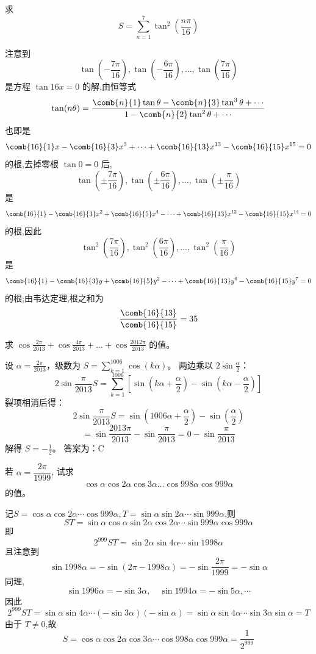 \begin{questions}
    \question 求  
    \[
    S = \sum_{n=1}^7 \tan^2\left(\frac{n\pi}{16}\right)
    \]
    \begin{solution}
        注意到 $$\tan\left(-\frac{7\pi}{16}\right), \tan\left(-\frac{6\pi}{16}\right), \dots, \tan\left(\frac{7\pi}{16}\right)$$ 是方程 $\tan16x = 0$ 的解,由恒等式
        \[
        \tan(n\theta) = \frac{\comb{n}{1} \tan\theta - \comb{n}{3} \tan^3\theta + \cdots}{1 - \comb{n}{2} \tan^2\theta + \cdots}
        \]也即是
        \[
        \comb{16}{1}x - \comb{16}{3}x^3 + \cdots + \comb{16}{13}x^{13} - \comb{16}{15}x^{15} = 0
        \]
        的根,去掉零根 $\tan0=0$ 后,
        $$\tan\left(\pm \frac{7\pi}{16}\right), \tan\left(\pm \frac{6\pi}{16}\right), \dots, \tan\left(\pm \frac{\pi}{16}\right)$$ 是
        \[
        \comb{16}{1} - \comb{16}{3}x^2 + \comb{16}{5}x^4 - \cdots + \comb{16}{13}x^{12} - \comb{16}{15}x^{14} = 0
        \]
        的根,因此$$\tan^2\left(\frac{7\pi}{16}\right), \tan^2\left(\frac{6\pi}{16}\right), \dots, \tan^2\left(\frac{\pi}{16}\right)$$ 
        是
        \[
        \comb{16}{1} - \comb{16}{3}y + \comb{16}{5}y^2 - \cdots + \comb{16}{13}y^6 - \comb{16}{15}y^7 = 0
        \]
        的根;由韦达定理,根之和为
        \[
        \frac{\comb{16}{13}}{\comb{16}{15}} = 35
        \]
    \end{solution}
\question 求 $\cos \frac{2\pi}{2013} + \cos \frac{4\pi}{2013} + \dots + \cos \frac{2012\pi}{2013}$ 的值。

\begin{solution}
设 $\alpha = \frac{2\pi}{2013}$，级数为 $S = \sum_{k=1}^{1006} \cos(k\alpha)$。
两边乘以 $2 \sin \frac{\alpha}{2}$：
\[
2 \sin \frac{\pi}{2013} S = \sum_{k=1}^{1006} [\sin(k\alpha + \frac{\alpha}{2}) - \sin(k\alpha - \frac{\alpha}{2})]
\]
裂项相消后得：
\[
2 \sin \frac{\pi}{2013} S = \sin(1006\alpha + \frac{\alpha}{2}) - \sin(\frac{\alpha}{2})
\]
\[
= \sin \frac{2013\pi}{2013} - \sin \frac{\pi}{2013} = 0 - \sin \frac{\pi}{2013}
\]
解得 $S = -\frac{1}{2}$。
答案为：C
\end{solution}
    \question 若 $\alpha = \dfrac{2\pi}{1999}$, 试求 
    \[
    \cos\alpha\cos 2\alpha\cos 3\alpha\ldots\cos 998\alpha\cos 999\alpha
    \]
    的值。
    \begin{solution}
        记$S = \cos \alpha \cos 2\alpha \cdots \cos 999\alpha, T = \sin \alpha \sin 2\alpha \cdots \sin 999\alpha$,则
        \[
        ST = \sin \alpha \cos \alpha \sin 2\alpha \cos 2\alpha \cdots \sin 999\alpha \cos 999\alpha 
        \]
        即
        \[
        2^{999} ST = \sin 2\alpha \sin 4\alpha \cdots \sin 1998\alpha
        \]
        且注意到
        \[
        \sin 1998\alpha = - \sin(2\pi - 1998\alpha) = - \sin\frac{2\pi}{1999} = - \sin \alpha
        \]
        同理,
        \[
        \sin 1996\alpha = - \sin 3\alpha, \quad \sin 1994\alpha = - \sin 5\alpha, \cdots
        \]
        因此
        \[
        2^{999} ST = \sin \alpha \sin 4\alpha \cdots (-\sin 3\alpha)(-\sin \alpha) = \sin \alpha \sin 4\alpha \cdots \sin 3\alpha \sin \alpha = T 
        \]
        由于 $T \neq 0$,故
        \[
        S = \cos \alpha \cos 2\alpha \cos 3\alpha \cdots \cos 998\alpha \cos 999\alpha = \frac{1}{2^{999}}
        \]
    \end{solution}


\end{questions}
